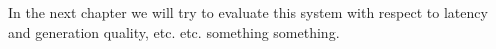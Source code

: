 


In the next chapter we will try to evaluate this system with respect to latency and generation quality, etc. etc. something something.

